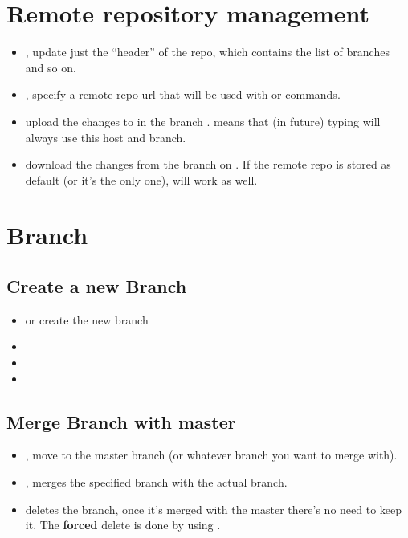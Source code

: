 \section{Remote repository management}
\begin{itemize}
\item {}, update just the ``header'' of the repo, which contains the list of branches and so on.
\item {}, specify a remote repo url that will be used with  or  commands. 
\item {} upload the changes to  in the branch .  means that (in future) typing  will always use this host and branch.
\item {} download the changes from the branch  on . If the remote repo is stored as default (or it's the only one),  will work as well.
\end {itemize}

\section{Branch}
\subsection{Create a new Branch}
\begin{itemize}
\item {} or  create the new branch
\item {}
\item {}
\item {}
\end{itemize}

\subsection{Merge Branch with master}
\begin{itemize}
\item {}, move to the master branch (or whatever branch you want to merge with).
\item {}, merges the specified branch with the actual branch.
\item {} deletes the branch, once it's merged with the master there's no need to keep it. The \textbf{forced} delete is done by using .
\end{itemize}

